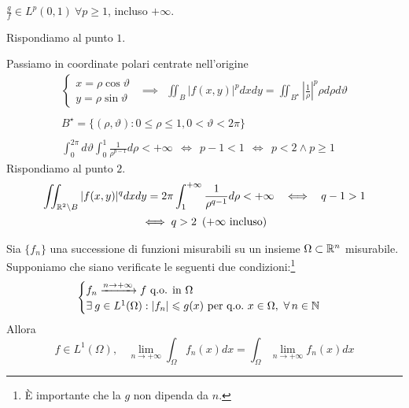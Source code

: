 $\frac{g}{f} \in L^{p}(0,1) \ \forall p\geqslant 1$, incluso $ + \infty $.
\Soluzione

Rispondiamo al punto $1$.

Passiamo in coordinate polari centrate nell'origine
\begin{gather*}
\begin{cases}
x = \rho \cos \vartheta \\
y = \rho \sin \vartheta 
\end{cases} \ \ \implies \ \ \iint _{B}| f(x,y)| ^{p} dxdy = \iint _{B^{\star }}\left| \frac{1}{\rho }\right| ^{p} \rho d\rho d\vartheta \\
\\
B^{\star } = \{(\rho ,\vartheta) :0\leqslant \rho \leqslant 1,0 < \vartheta < 2\pi \}\\
\\
\int ^{2\pi }_{0} d\vartheta \int ^{1}_{0}\frac{1}{\rho ^{p - 1}} d\rho < + \infty \ \ \iff \ \ p - 1 < 1\ \ \iff \ \ p < 2\land p\geqslant 1
\end{gather*}
Rispondiamo al punto $2$.
\begin{gather*}
\iint _{\mathbb{R} ^{2} \setminus B}| f(x,y)| ^{q} dxdy = 2\pi \int ^{ + \infty }_{1}\frac{1}{\rho ^{q - 1}} d\rho < + \infty \ \ \iff \ \ q - 1 > 1\\
\iff q > 2\ \left(+ \infty \ \text{incluso}\right)
\end{gather*}
\Soluzione
\begin{thm}
 Sia $\{f_{n}\}$ una successione di funzioni misurabili su un insieme $\Omega \subset \mathbb{R} ^{n}$ misurabile. Supponiamo che siano verificate le seguenti due condizioni:\footnote{È importante che la $g$ non dipenda da $n$.}
\begin{equation*}
\begin{cases}
f_{n}\xrightarrow{n\rightarrow + \infty } f\ \text{q.o. in} \ \Omega \\
\exists g\in L^{1}(\Omega) :| f_{n}| \leqslant g(x) \ \text{per q.o.} \ x\in \Omega ,\ \forall n\in \NN 
\end{cases}
\end{equation*}
Allora
\begin{equation*}
f\in L^{1}(\Omega) ,\ \ \ \ \lim _{n\rightarrow + \infty }\int _{\Omega } f_{n}(x) dx = \int _{\Omega }\lim _{n\rightarrow + \infty } f_{n}(x) dx
\end{equation*}
\end{thm}
